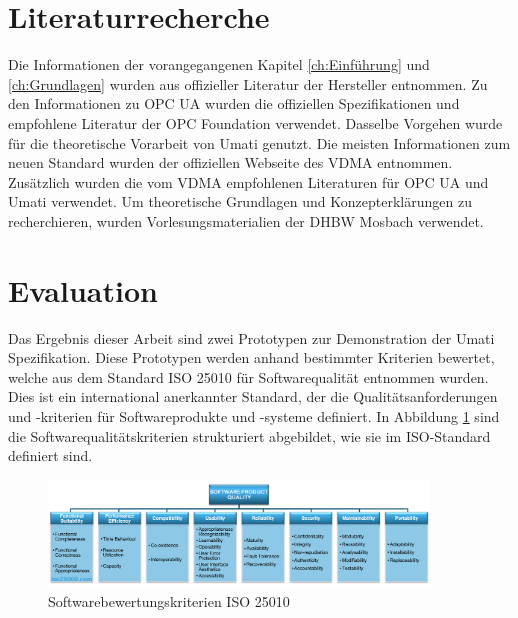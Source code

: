 \documentclass[a4paper, 12pt, oneside, toc=listofnumbered, bibliography=totoc]{scrbook}
\begin{document}
	\section{Literaturrecherche}
	
	Die Informationen der vorangegangenen Kapitel \ref{ch:Einführung} und \ref{ch:Grundlagen} wurden aus offizieller Literatur der Hersteller entnommen. Zu den Informationen zu OPC UA wurden die offiziellen Spezifikationen und empfohlene Literatur der OPC Foundation verwendet. Dasselbe Vorgehen wurde für die theoretische Vorarbeit von \ac{Umati} genutzt. Die meisten Informationen zum neuen Standard wurden der offiziellen Webseite des VDMA entnommen. Zusätzlich wurden die vom VDMA empfohlenen Literaturen für OPC UA und Umati verwendet. Um theoretische Grundlagen und Konzepterklärungen zu recherchieren, wurden Vorlesungsmaterialien der DHBW Mosbach verwendet.
	
	
	
	\section{Evaluation}
	
	
	Das Ergebnis dieser Arbeit sind zwei Prototypen zur Demonstration der \ac{Umati} Spezifikation. Diese Prototypen werden anhand bestimmter Kriterien bewertet, welche aus dem Standard ISO 25010 für Softwarequalität entnommen wurden. Dies ist ein international anerkannter Standard, der die Qualitätsanforderungen und -kriterien für Softwareprodukte und -systeme definiert. In Abbildung \ref{fig:ISO25010} sind die Softwarequalitätskriterien strukturiert abgebildet, wie sie im ISO-Standard definiert sind. 
	
	\begin{figure}[H]
		\centering
		\includegraphics[width=0.9\textwidth]{res/diagramms/iso25010.png}
		\caption{Softwarebewertungskriterien ISO 25010} 
		\label{fig:ISO25010}
	\end{figure}
	
\end{document}
